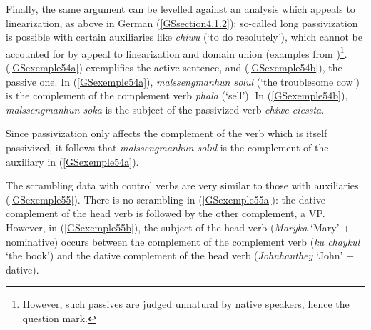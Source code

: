 \documentclass[output=paper
	        ,collection
	        ,collectionchapter
 	        ,biblatex
                ,babelshorthands
                ,newtxmath
                ,draftmode
                ,colorlinks, citecolor=brown
]{langscibook}
\begin{document}
{	\label{GSexemple53c}
	
\zl

Finally, the same argument can be levelled against an analysis which appeals to linearization, as above in German (\ref{GSsection4.1.2}): so-called long passivization is possible with certain auxiliaries like \emph{chiwu} (`to do resolutely'), which cannot be accounted for by appeal to linearization and domain union (examples from \citealt[164]{Chung98a-u})\footnote{However, such passives are judged unnatural by native speakers, hence the question mark.}. (\ref{GSexemple54a}) exemplifies the active sentence, and (\ref{GSexemple54b}), the passive one. In (\ref{GSexemple54a}), \emph{malssengmanhun solul} (`the troublesome cow') is the complement of the complement verb \emph{phala} (`sell'). In (\ref{GSexemple54b}), \emph{malssengmanhun soka} is the subject of the passivized verb \emph{chiwe ciessta}.

\eal
	\label{GSexemple54} 
	\label{GSexemple54a}
		
	\label{GSexemple54b}
\zl

Since passivization only affects the complement of the verb which is itself passivized, it follows that \emph{malssengmanhun solul} is the complement of the auxiliary in (\ref{GSexemple54a}).

The scrambling data with control verbs are very similar to those with auxiliaries (\ref{GSexemple55}). There is no scrambling in (\ref{GSexemple55a}): the dative complement of the head verb is followed
by the other complement, a VP. However, in (\ref{GSexemple55b}), the subject of the head verb (\emph{Maryka} `Mary' + nominative) occurs between the complement of the complement verb (\emph{ku chaykul} `the book') and the dative complement of the head verb (\emph{Johnhanthey} `John' + dative).

}
\end{document}
